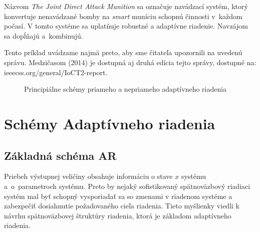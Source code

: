 \documentclass[a4paper, 10pt, ]{article}
\begin{document}
Názvom \emph{The Joint Direct Attack Munition} sa označuje navádzací systém, ktorý konvertuje nenavádzané bomby na \emph{smart} muníciu schopnú činnosti v~každom počasí. V tomto systéme sa uplatňuje robustné a adaptívne riadenie. Navzájom sa dopĺňajú a~kombinujú.

Tento príklad uvádzame najmä preto, aby sme čitateľa upozornili na uvedenú správu. Medzičasom (2014) je dostupná aj druhá edícia tejto správy, dostupné na: ieeecss.org/general/IoCT2-report.




\begin{figure}[!ht]
	\centering
	\label{Základá schéma adaptívneho riadenia a schéma Gain Scheduling}
\end{figure}





\begin{figure}[!hb]
	\centering

	\vspace{-3mm}

	\caption{Principiálne schémy priameho a nepriameho adaptívneho riadenia}
	\label{Principiálne schémy priameho a nepriameho adaptívneho riadenia}
\end{figure}





\section{Schémy Adaptívneho riadenia}



\subsection{Základná schéma AR}

Priebeh výstupnej veličiny obsahuje informáciu o stave $x$ systému a~o~parametroch systému. Preto by nejaký sofistikovaný spätnoväzbový riadiaci systém mal byť schopný vysporiadať sa so zmenami v riadenom systéme a zabezpečiť dosiahnutie požadovaného cieľa riadenia. Tieto myšlienky viedli k návrhu spätnoväzbovej štruktúry riadenia, ktorá je základom adaptívneho riadenia.
\end{document}
